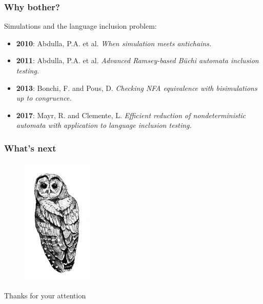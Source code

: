 \documentclass{beamer}
\begin{document}
\begin{frame}
\frametitle{Why bother?}
Simulations and the language inclusion problem:
\begin{itemize}
\pause
\item \textbf{2010}: Abdulla, P.A. et al. \emph{When simulation meets antichains.}
\pause
\item \textbf{2011}: Abdulla, P.A. et al. \emph{Advanced Ramsey-based B{\"u}chi automata inclusion testing.}
\pause
\item \textbf{2013}: Bonchi, F. and Pous, D. \emph{Checking NFA equivalence with bisimulations up to congruence.}
\pause
\item \textbf{2017}: Mayr, R. and Clemente, L. \emph{
Efficient reduction of nondeterministic automata with application to language inclusion testing.  }
\end{itemize}
\end{frame}

\begin{frame}
\frametitle{What's next}
\begin{figure}[h]
    \centering
    \includegraphics[width=0.3\textwidth]{../img/owl.jpg}
\end{figure}
\end{frame}

\begin{frame}
\begin{center}
\Huge Thanks for your attention
\end{center}
\end{frame}



%         
%         
\end{document}
